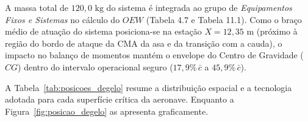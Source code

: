 \begin{table}[H]
\centering
\caption{Estimativa de massa e distribuição dos componentes do sistema de degelo.}
\label{tab:massa_degelo}
\end{table}

A massa total de $120,0\text{ kg}$ do sistema é integrada ao grupo de \textit{Equipamentos Fixos e Sistemas} no cálculo do $OEW$ (Tabela 4.7 e Tabela 11.1). Como o braço médio de atuação do sistema posiciona-se na estação $X = 12,35\text{ m}$ (próximo à região do bordo de ataque da CMA da asa e da transição com a cauda), o impacto no balanço de momentos mantém o envelope do Centro de Gravidade ($CG$) dentro do intervalo operacional seguro ($17,9\%\,\bar{c}$ a $45,9\%\,\bar{c}$).

A Tabela~\ref{tab:posicoes_degelo} resume a distribuição espacial e a tecnologia adotada para cada superfície crítica da aeronave. Enquanto a Figura~\ref{fig:posicao_degelo} as apresenta graficamente.

